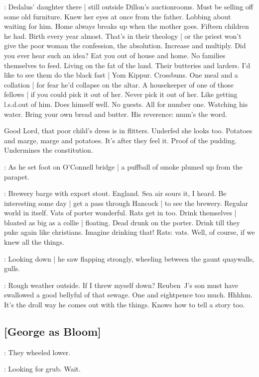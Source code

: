 \BloomInt:
Dedalus' daughter there |
still outside Dillon's auctionrooms.
Must be selling off some old furniture.
Knew her eyes at once from the father.
Lobbing about waiting for him.
Home always breaks up when the mother goes.
Fifteen children he had.
Birth every year almost.
That's in their theology |
or the priest won't give the poor woman
the confession,
the absolution.
Increase and multiply.
Did you ever hear such an idea?
Eat you out of house and home.
No families themselves to feed.
Living on the fat of the land.
Their butteries and larders.
I'd like to see them do the black fast |
Yom Kippur.
Crossbuns.
One meal and a collation |
for fear he'd collapse on the altar.
A housekeeper of one of those fellows |
if you could pick it out of her.
Never pick it out of her.
Like getting l.s.d.\@ out of him.
Does himself well.
No guests.
All for number one.
Watching his water.
Bring your own bread and butter.
His reverence:
mum's the word.

Good Lord, that poor child's dress is in flitters.
Underfed she looks too.
Potatoes and marge,
marge and potatoes.
It's after they feel it.
Proof of the pudding.
Undermines the constitution.

:
As he set foot on O'Connell bridge |
a puffball of smoke plumed up from the parapet.

\BloomInt:
Brewery barge with export stout.
England.
Sea air sours it, I heard.
Be interesting some day |
get a pass through Hancock |
to see the brewery.
Regular world in itself.
Vats of porter wonderful.
Rats get in too.
Drink themselves |
bloated as big as a collie |
floating.
Dead drunk on the porter.
Drink till they puke again like christians.
Imagine drinking that!
Rats: vats.
Well, of course,
if we knew all the things.

:
Looking down |
he saw flapping strongly,
wheeling between the gaunt quaywalls,
gulls.

\BloomInt:
Rough weather outside.
If I threw myself down?
Reuben~J's son must have swallowed a good bellyful of that sewage.
One and eightpence too much.
Hhhhm.
It's the droll way he comes out with the things.
Knows how to tell a story too.

\subsection{[George as Bloom]}

:
They wheeled lower.

\BloomInt:
Looking for grub.
Wait.


